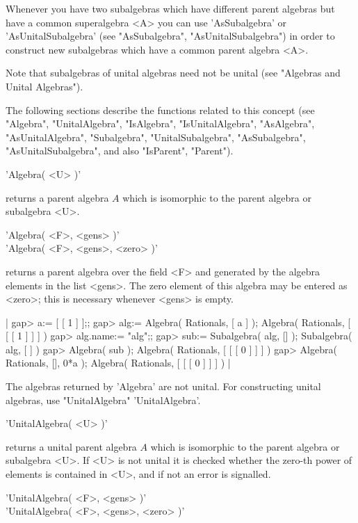 Whenever you have  two subalgebras which have different  parent algebras
but have a common superalgebra <A> you can use 'AsSubalgebra' or
'AsUnitalSubalgebra' (see "AsSubalgebra", "AsUnitalSubalgebra") in order
to construct new subalgebras which have a common parent algebra <A>.

Note that subalgebras of unital algebras need not be unital (see "Algebras
and Unital Algebras").

The following sections describe  the functions  related  to  this concept
(see "Algebra", "UnitalAlgebra", "IsAlgebra", "IsUnitalAlgebra",
"AsAlgebra", "AsUnitalAlgebra", "Subalgebra", "UnitalSubalgebra",
"AsSubalgebra", "AsUnitalSubalgebra", and also "IsParent", "Parent").


'Algebra( <U> )'

returns a parent algebra $A$ which is isomorphic to the parent algebra or
subalgebra <U>.

'Algebra( <F>, <gens> )' \\
'Algebra( <F>, <gens>, <zero> )'

returns a parent algebra over the field <F> and generated by the algebra
elements in the list <gens>.  The zero element of this algebra may be
entered as <zero>; this is necessary whenever <gens> is empty.

|    gap> a:= [ [ 1 ] ];;
    gap> alg:= Algebra( Rationals, [ a ] );
    Algebra( Rationals, [ [ [ 1 ] ] ] )
    gap> alg.name:= "alg";;
    gap> sub:= Subalgebra( alg, [] );
    Subalgebra( alg, [  ] )
    gap> Algebra( sub );
    Algebra( Rationals, [ [ [ 0 ] ] ] )
    gap> Algebra( Rationals, [], 0*a );
    Algebra( Rationals, [ [ [ 0 ] ] ] ) |

The algebras returned by 'Algebra' are not unital.  For constructing
unital algebras, use "UnitalAlgebra" 'UnitalAlgebra'.


'UnitalAlgebra( <U> )'

returns a unital parent algebra $A$ which is isomorphic to the parent
algebra or subalgebra <U>.  If <U> is not unital it is checked whether
the zero-th power of elements is contained in <U>, and if not an error
is signalled.

'UnitalAlgebra( <F>, <gens> )' \\
'UnitalAlgebra( <F>, <gens>, <zero> )'

